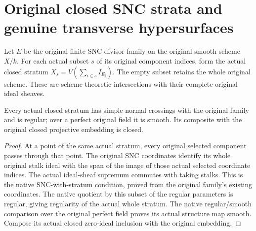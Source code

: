 \section{Original closed SNC strata and genuine transverse hypersurfaces}

Let $E$ be the original finite SNC divisor family on the original smooth
scheme $X/k$.  For each actual subset $s$ of its original component indices,
form the actual closed stratum $X_s=V(\sum_{i\in s}I_{E_i})$.  The empty
subset retains the whole original scheme.  These are scheme-theoretic
intersections with their complete original ideal sheaves.

\begin{lemma}
\label{lem:kn-nadel-bertini-snc-strata}
\leanok
Every actual closed stratum has simple normal crossings with the original
family and is regular; over a perfect original field it is smooth.  Its
composite with the original closed projective embedding is closed.
\end{lemma}
\begin{proof}
At a point of the same actual stratum, every original selected component
passes through that point.  The original SNC coordinates identify its
whole original stalk ideal with the span of the image of those actual
selected coordinate indices.  The actual ideal-sheaf supremum commutes
with taking stalks.  This is the native SNC-with-stratum condition, proved
from the original family's existing coordinates.  The native quotient by
this subset of the regular parameters is regular, giving regularity of
the actual whole stratum.  The native regular/smooth comparison over the
original perfect field proves its actual structure map smooth.  Compose
its actual closed zero-ideal inclusion with the original embedding.
\end{proof}

